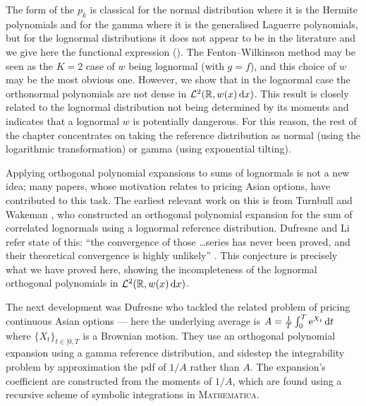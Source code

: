 The form of the $p_k$ is classical for the normal distribution where it is the Hermite polynomials and for the gamma where  it is the generalised Laguerre polynomials,
but for the lognormal distributions it does not appear to be in the literature and we give here  the functional expression
(). The Fenton--Wilkinson method may be seen
as the $K=2$ case of $w$ being lognormal (with $g=f$), and this choice of $w$  may be the most obvious one.
However, we show that in the lognormal case the orthonormal polynomials are not dense in $\mathcal{L}^2(\mathbb{R}, w(x) \mathop{}\!\mathrm{d} x)$. This result is closely related
to the lognormal distribution not being determined by its moments
\cite{Heyde63,Berg1984} and indicates that a lognormal $w$ is potentially dangerous.
For this reason, the rest of the chapter concentrates on  taking the reference distribution as normal (using the logarithmic transformation)
or gamma  (using exponential tilting).

Applying orthogonal polynomial expansions to sums of lognormals is not a new idea; many papers, whose motivation relates to pricing Asian options, have contributed to this task. The earliest relevant work on this is from Turnbull and Wakeman \cite{turnbull1991quick}, who constructed an orthogonal polynomial expansion for the sum of correlated lognormals using a lognormal reference distribution. Dufresne and Li refer state of this: ``the convergence of those \dots series has never been proved, and their theoretical convergence is highly unlikely'' \cite[p.\ 1]{dufresne2016pricing}. This conjecture is precisely what we have proved here, showing the incompleteness of the lognormal orthogonal polynomials in $\mathcal{L}^2(\mathbb{R}, w(x) \mathop{}\!\mathrm{d} x)$.

The next development was Dufresne \cite{dufresne2000laguerre} who tackled the related problem of pricing continuous Asian options --- here the underlying average is $A = \frac1T \int_0^T \mathrm{e}^{X_t} \mathop{}\!\mathrm{d} t$ where $\{X_t\}_{t\in[0,T}$ is a Brownian motion. They use an orthogonal polynomial expansion using a gamma reference distribution, and sidestep the integrability problem by approximation the pdf of $1/A$ rather than $A$. The expansion's coefficient are constructed from the moments of $1/A$, which are found using a recursive scheme of symbolic integrations in \textsc{Mathematica}.

